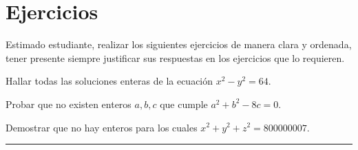\section*{Ejercicios}

Estimado estudiante, realizar los siguientes ejercicios de manera clara y ordenada, tener presente siempre justificar sus respuestas en los ejercicios que lo requieren.

\begin{exercise}
    Hallar todas las soluciones enteras de la ecuación $x^2 - y^2 = 64$.
\end{exercise}

\begin{exercise}
    Probar que no existen enteros $a,b,c$ que cumple $a^2 + b^2 - 8c = 0$.
\end{exercise}

\begin{exercise}
    Demostrar que no hay enteros para los cuales $x^2 + y^2 + z^2 = 800000007$.
\end{exercise}
\hrule



